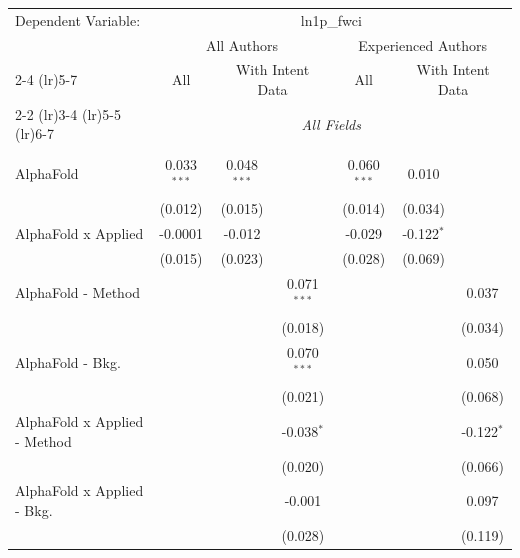 \begingroup
\centering
\begin{tabular}{lcccccc}
   \tabularnewline \midrule \midrule
   Dependent Variable: & \multicolumn{6}{c}{ln1p\_fwci}\\
 & \multicolumn{3}{c}{All Authors} & \multicolumn{3}{c}{Experienced Authors} \\
\cmidrule(lr){2-4} \cmidrule(lr){5-7}
 & \multicolumn{1}{c}{All} & \multicolumn{2}{c}{With Intent Data} & \multicolumn{1}{c}{All} & \multicolumn{2}{c}{With Intent Data} \\
\cmidrule(lr){2-2} \cmidrule(lr){3-4} \cmidrule(lr){5-5} \cmidrule(lr){6-7}
 & \multicolumn{6}{c}{\textit{All Fields}} \\ \\
   AlphaFold                      & 0.033$^{***}$ & 0.048$^{***}$ &               & 0.060$^{***}$ & 0.010         &   \\   
                                  & (0.012)       & (0.015)       &               & (0.014)       & (0.034)       &   \\   
   AlphaFold x Applied            & -0.0001       & -0.012        &               & -0.029        & -0.122$^{*}$  &   \\   
                                  & (0.015)       & (0.023)       &               & (0.028)       & (0.069)       &   \\   
   AlphaFold - Method             &               &               & 0.071$^{***}$ &               &               & 0.037\\   
                                  &               &               & (0.018)       &               &               & (0.034)\\   
   AlphaFold - Bkg.               &               &               & 0.070$^{***}$ &               &               & 0.050\\   
                                  &               &               & (0.021)       &               &               & (0.068)\\   
   AlphaFold x Applied - Method   &               &               & -0.038$^{*}$  &               &               & -0.122$^{*}$\\   
                                  &               &               & (0.020)       &               &               & (0.066)\\   
   AlphaFold x Applied - Bkg.     &               &               & -0.001        &               &               & 0.097\\   
                                  &               &               & (0.028)       &               &               & (0.119)\\   

\end{tabular}
